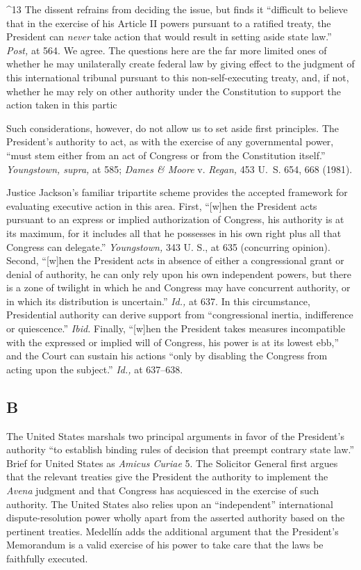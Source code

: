 {^13 The dissent refrains from deciding the issue, but finds it
``difficult to believe that in the exercise of his Article II powers
pursuant to a ratified treaty, the President can \emph{never} take action
that would result in setting aside state law.'' \emph{Post,} at 564.
We agree. The questions here are the far more limited ones of whether
he may unilaterally create federal law by giving effect to the judgment
of this international tribunal pursuant to this non-self-executing
treaty, and, if not, whether he may rely on other authority under the
Constitution to support the action taken in this partic

  Such considerations, however, do not allow us to set aside first
principles. The President's authority to act, as with the exercise
of any governmental power, ``must stem either from an act of Congress
or from the Constitution itself.'' \emph{Youngstown, supra,} at 585;
\emph{Dames \& Moore} v. \emph{Regan,} 453 U.~S. 654, 668 (1981).

  Justice Jackson's familiar tripartite scheme provides the accepted
framework for evaluating executive action in this area. First, ``[w]hen
the President acts pursuant to an express or implied authorization of
Congress, his authority is at its maximum, for it includes all that
he possesses in his own right plus all that Congress can delegate.''
\emph{Youngstown,} 343 U. S., at 635 (concurring opinion). Second,
``[w]hen the President acts in absence of either a congressional grant
or denial of authority, he can only rely upon his own independent
powers, but there is a zone of twilight in which he and Congress may
have concurrent authority, or in which its distribution is uncertain.''
\emph{Id.,} at 637. In this circumstance, Presidential authority
can derive support from ``congressional inertia, indifference or
quiescence.'' \emph{Ibid.} \newpage  Finally, ``[w]hen the President
takes measures incompatible with the expressed or implied will of
Congress, his power is at its lowest ebb,'' and the Court can sustain
his actions ``only by disabling the Congress from acting upon the
subject.'' \emph{Id.,} at 637--638.

\subsection{B}

  The United States marshals two principal arguments in favor of the
President's authority ``to establish binding rules of decision that
preempt contrary state law.'' Brief for United States as \emph{Amicus
Curiae} 5. The Solicitor General first argues that the relevant
treaties give the President the authority to implement the \emph{Avena}
judgment and that Congress has acquiesced in the exercise of such
authority. The United States also relies upon an ``independent''
international dispute-resolution power wholly apart from the asserted
authority based on the pertinent treaties. Medellín adds the additional
argument that the President's Memorandum is a valid exercise of his
power to take care that the laws be faithfully executed.

}
